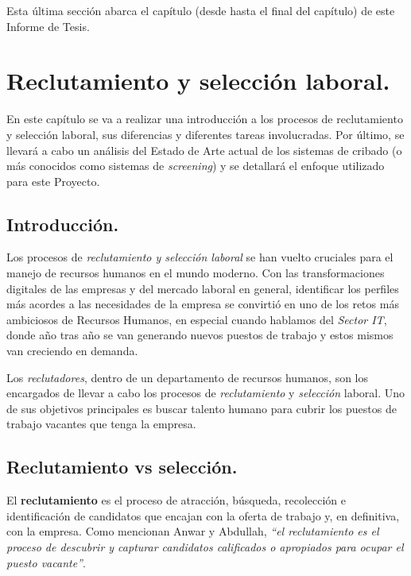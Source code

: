 \documentclass[12pt,a4paper]{article}
\begin{document}
\begin{sloppypar}
\begin{enumerate}
Esta última sección abarca el capítulo \textit{} (desde \textit{} hasta el final del capítulo) de este Informe de Tesis.
\end{enumerate}

\cleardoublepage    %

\section{Reclutamiento y selección laboral.}\label{2.ReclutamientolaboralenIT}

En este capítulo se va a realizar una introducción a los procesos de reclutamiento y selección laboral, sus diferencias y diferentes tareas involucradas. Por último, se llevará a cabo un análisis del Estado de Arte actual de los sistemas de cribado (o más conocidos como sistemas de \textit{screening}) y se detallará el enfoque utilizado para este Proyecto.

\subsection{Introducción.}

Los procesos de \textit{reclutamiento y selección laboral} se han vuelto cruciales para el manejo de recursos humanos en el mundo moderno. Con las transformaciones digitales de las empresas y del mercado laboral en general, identificar los perfiles más acordes a las necesidades de la empresa se convirtió en uno de los retos más ambiciosos de Recursos Humanos, en especial cuando hablamos del \textit{Sector IT}, donde año tras año se van generando nuevos puestos de trabajo y estos mismos van creciendo en demanda. 

Los \textit{reclutadores}, dentro de un departamento de recursos humanos, son los encargados de llevar a cabo los procesos de \textit{reclutamiento} y \textit{selección} laboral. Uno de sus objetivos principales es buscar talento humano para cubrir los puestos de trabajo vacantes que tenga la empresa.

\subsection{Reclutamiento vs selección.}\label{SeleccionYReclutamiento}

El \textbf{reclutamiento} es el proceso de atracción, búsqueda, recolección e identificación de candidatos que encajan con la oferta de trabajo y, en definitiva, con la empresa. Como mencionan Anwar y Abdullah, \textit{``el reclutamiento es el proceso de descubrir y capturar candidatos calificados o apropiados para ocupar el puesto vacante''}\cite{seleccion_reclutamiento_2}.


\end{sloppypar}
\end{document}
